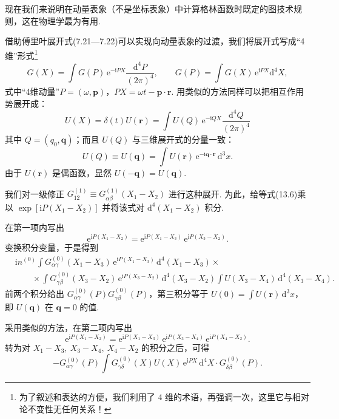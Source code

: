 现在我们来说明在动量表象（不是坐标表象）中计算格林函数时既定的图技术规则，这在物理学最为有用.

借助傅里叶展开式(7.21—7.22)可以实现向动量表象的过渡，我们将展开式写成“4维”形式\footnote{为了叙述和表达的方便，我们利用了 4 维的术语，再强调一次，这里它与相对论不变性无任何关系！}
\begin{equation}
G(X)=\int G(P)\,\mathrm{e}^{-\mathrm{i}PX}\frac{\mathrm{d}^4P}{(2\pi)^4},\qquad G(P)=\int G(X)\,\mathrm{e}^{\mathrm{i}PX}\mathrm{d}^4X,
\end{equation}
式中“4维动量”$P=(\omega,\bm p)$，$PX=\omega t-\bm p\cdot\bm r$. 用类似的方法同样可以把相互作用势展开成：
\begin{equation}
U(X)=\delta(t)U(\bm r)=\int U(Q)\,\mathrm{e}^{-\mathrm{i}QX}\frac{\mathrm{d}^4Q}{(2\pi)^4}
\end{equation}
其中 $Q=(q_0,\bm q)$；而且 $U(Q)$ 与三维展开式的分量一致：
\begin{equation}
U(Q)\equiv U(\bm q)=\int U(\bm r)\,\mathrm{e}^{-\mathrm{i}\bm q\cdot\bm r}\,\mathrm{d}^3x.
\end{equation}
由于 $U(\bm r)$ 是偶函数，显然 $U(-\bm q)=U(\bm q)$.

我们对一级修正 $G^{(1)}_{12}\equiv G^{(1)}_{\alpha\beta}(X_1-X_2)$ 进行这种展开. 为此，给等式(13.6)乘以 $\exp[\mathrm{i}P(X_1-X_2)]$ 并将该式对 $\mathrm{d}^4(X_1-X_2)$ 积分.

在第一项内写出
\begin{equation*}
\mathrm{e}^{\mathrm{i}P(X_1-X_2)}=\mathrm{e}^{\mathrm{i}P(X_1-X_3)}\,\mathrm{e}^{\mathrm{i}P(X_3-X_2)}.
\end{equation*}
变换积分变量，于是得到
\begin{equation*}
\begin{aligned}
&\mathrm{i}n^{(0)}\int G^{(0)}_{\alpha\gamma}(X_1-X_3)\,\mathrm{e}^{\mathrm{i}P(X_1-X_3)}\,\mathrm{d}^4(X_1-X_3)\times\\
&\qquad\times\int G^{(0)}_{\gamma\beta}(X_3-X_2)\,\mathrm{e}^{\mathrm{i}P(X_3-X_2)}\,\mathrm{d}^4(X_3-X_2)\int U(X_3-X_4)\,\mathrm{d}^4(X_3-X_4).
\end{aligned}
\end{equation*}
前两个积分给出 $G^{(0)}_{\alpha\gamma}(P)G^{(0)}_{\gamma\beta}(P)$，第三积分等于 $U(0)=\int U(\bm r)\,\mathrm{d}^3x$，即 $U(\bm q)$ 在 $\bm q=0$ 的值.

采用类似的方法，在第二项内写出
\begin{equation*}
\mathrm{e}^{\mathrm{i}P(X_1-X_2)}=\mathrm{e}^{\mathrm{i}P(X_1-X_3)}\,\mathrm{e}^{\mathrm{i}P(X_3-X_4)}\,\mathrm{e}^{\mathrm{i}P(X_4-X_2)}.
\end{equation*}
转为对 $X_1-X_3,\ X_3-X_4,\ X_4-X_2$ 的积分之后，可得
\begin{equation*}
-G^{(0)}_{\alpha\gamma}(P)\int G^{(0)}_{\gamma\delta}(X)U(X)\,\mathrm{e}^{\mathrm{i}PX}\,\mathrm{d}^4X\cdot G^{(0)}_{\delta\beta}(P).
\end{equation*}

